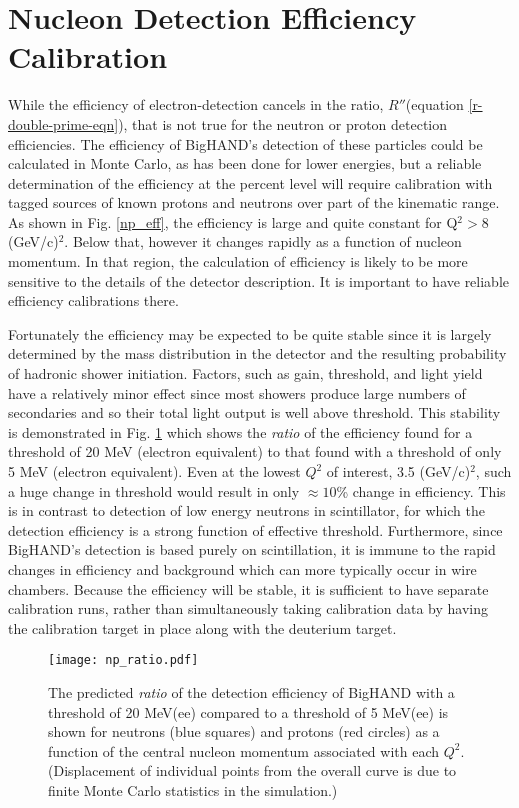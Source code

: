 \documentclass[12pt,letterpaper,oneside]{article}
\begin{document}
\section{Nucleon Detection Efficiency Calibration}
While the efficiency of electron-detection cancels in the ratio,
$R''$(equation \ref{r-double-prime-eqn}), that is not true for the neutron or proton detection
efficiencies.  The efficiency of BigHAND's detection of these
particles could be calculated in Monte Carlo, as has been done for
lower energies\cite{BH_simulation}, but a reliable determination of
the efficiency at the percent level will require calibration with
tagged sources of known protons and neutrons over part of the
kinematic range.  As shown in Fig. \ref{np_eff}, the efficiency is
large and quite constant for Q$^2 > 8$ (GeV/c)$^2$.  Below that,
however it changes rapidly as a function of nucleon momentum.  In that
region, 
the calculation of efficiency is likely to be more sensitive to the
details of the detector description.  It is important to have reliable
efficiency calibrations there.  

Fortunately the
efficiency may be expected to be quite stable since it is largely
determined by the mass distribution in the detector and the resulting
probability of hadronic shower initiation.  Factors, such as gain,
threshold, and light yield have a relatively minor effect since most showers
produce large numbers of secondaries and so 
their total light output is well above threshold.
This stability is demonstrated in Fig. \ref{np_ratio} which shows
the {\em ratio} of the efficiency found \cite{BH_simulation}  
for a threshold of 20 MeV (electron equivalent) to that found with a
threshold of only 5 MeV (electron equivalent).  Even at the lowest $Q^2$ of
interest, 3.5 (GeV/c)$^2$, such a huge change in threshold would result in only
$\approx 10$\% change in efficiency.
This is in contrast to detection of
low energy neutrons in scintillator, for which the detection
efficiency is a strong function of effective threshold.  Furthermore,
since BigHAND's detection is based purely on scintillation, it is
immune to the rapid changes in efficiency and background which can
more typically occur in wire chambers.
Because the efficiency will be stable, it is sufficient to have separate
calibration runs, rather than simultaneously taking calibration data
by having the calibration target in place
along with the deuterium target.  

\begin{figure}
\begin{center}
\texttt{[image: np\_ratio.pdf]}\\
\end{center}
\caption{\label{np_ratio}
The predicted \cite{BH_simulation}  {\em ratio} of the detection efficiency 
of BigHAND with a threshold of 20 MeV(ee) compared to a threshold of 5
MeV(ee) is shown for neutrons
(blue squares) and protons (red circles) as a function of the central nucleon
momentum associated with each $Q^2$.  (Displacement of individual
points from the overall curve is due to finite
Monte Carlo statistics in the simulation.)
}
\end{figure}
\end{document}

